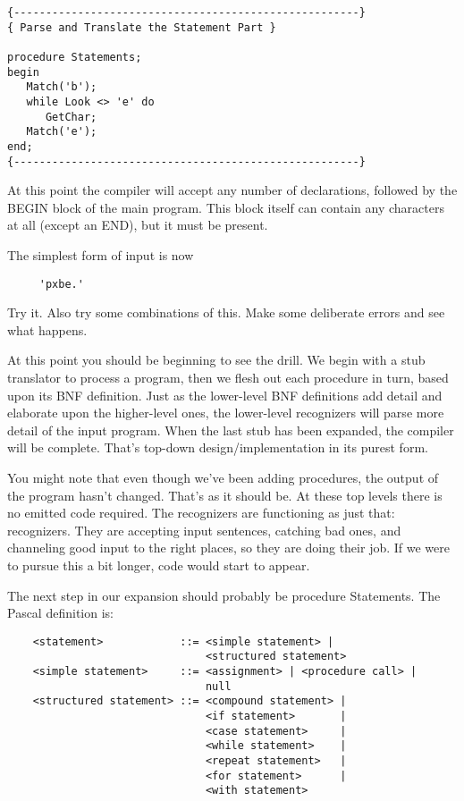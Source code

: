 \begin{verbatim}
{------------------------------------------------------}
{ Parse and Translate the Statement Part }

procedure Statements;
begin
   Match('b');
   while Look <> 'e' do
      GetChar;
   Match('e');
end;
{------------------------------------------------------}
\end{verbatim}

At  this  point  the  compiler   will   accept   any   number  of declarations, followed by the  BEGIN  block  of the main program. This  block  itself  can contain any characters at all (except an END), but it must be present.

The simplest form of input is now

\begin{verbatim}
     'pxbe.'
\end{verbatim}

Try  it. Also  try  some  combinations  of  this. Make  some deliberate errors and see what happens.

At this point you should be beginning to see the drill. We begin with a stub translator to process a program, then  we  flesh  out each procedure in turn, based  upon its BNF definition. Just as the lower-level BNF definitions add detail and elaborate upon the higher-level ones, the lower-level  recognizers  will  parse more detail  of  the  input  program. When  the  last stub has been expanded, the  compiler  will  be  complete. That's  top-down design/implementation in its purest form.

You might note that even though we've been adding procedures, the output of the program hasn't changed. That's as  it  should  be. At these  top  levels  there  is  no  emitted code required. The recognizers are  functioning as just that: recognizers. They are accepting input sentences, catching bad ones, and channeling good input to the right places, so  they  are  doing their job. If we were to pursue this a bit longer, code would start to appear.

The  next  step  in our expansion should  probably  be  procedure Statements. The Pascal definition is:

{\small
\begin{verbatim}
    <statement>            ::= <simple statement> |
                               <structured statement>
    <simple statement>     ::= <assignment> | <procedure call> |
                               null
    <structured statement> ::= <compound statement> |
                               <if statement>       |
                               <case statement>     |
                               <while statement>    |
                               <repeat statement>   |
                               <for statement>      |
                               <with statement>
\end{verbatim} }

